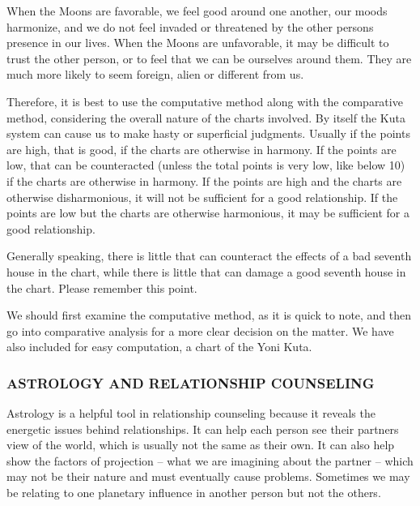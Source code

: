  

When the Moons are favorable, we feel good around one another, our moods harmonize, and we do not feel invaded or threatened by the other persons presence in our lives. When the Moons are unfavorable, it may be difficult to trust the other person, or to feel that we can be ourselves around them. They are much more likely to seem foreign, alien or different from us.

 

Therefore, it is best to use the computative method along with the comparative method, considering the overall nature of the charts involved. By itself the Kuta system can cause us to make hasty or superficial judgments. Usually if the points are high, that is good, if the charts are otherwise in harmony. If the points are low, that can be counteracted (unless the total points is very low, like below 10) if the charts are otherwise in harmony. If the points are high and the charts are otherwise disharmonious, it will not be sufficient for a good relationship. If the points are low but the charts are otherwise harmonious, it may be sufficient for a good relationship.

 

Generally speaking, there is little that can counteract the effects of a bad seventh house in the chart, while there is little that can damage a good seventh house in the chart. Please remember this point.

 

We should first examine the computative method, as it is quick to note, and then go into comparative analysis for a more clear decision on the matter.
We have also included for easy computation, a chart of the Yoni Kuta.
 



 

\subsubsection{ASTROLOGY AND RELATIONSHIP COUNSELING}

 

Astrology is a helpful tool in relationship counseling because it reveals the energetic issues behind relationships. It can help each person see their partners view of the world, which is usually not the same as their own. It can also help show the factors of projection – what we are imagining about the partner – which may not be their nature and must eventually cause problems. Sometimes we may be relating to one planetary influence in another person but not the others.

